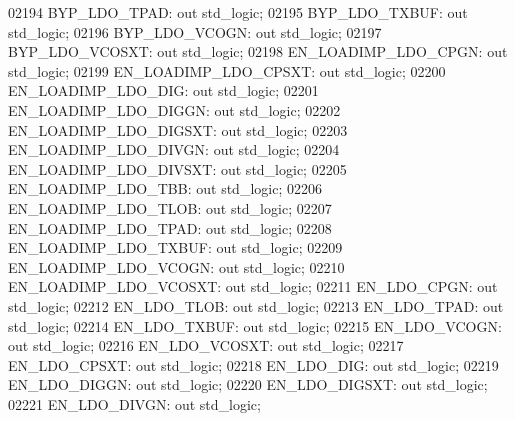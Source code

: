 \begin{DoxyCode}
02194     BYP\_LDO\_TPAD:   \textcolor{keywordflow}{out} \textcolor{comment}{std\_logic};
02195     BYP\_LDO\_TXBUF:  \textcolor{keywordflow}{out} \textcolor{comment}{std\_logic};
02196     BYP\_LDO\_VCOGN:  \textcolor{keywordflow}{out} \textcolor{comment}{std\_logic};
02197     BYP\_LDO\_VCOSXT: \textcolor{keywordflow}{out} \textcolor{comment}{std\_logic};
02198     EN\_LOADIMP\_LDO\_CPGN:    \textcolor{keywordflow}{out} \textcolor{comment}{std\_logic};
02199     EN\_LOADIMP\_LDO\_CPSXT:   \textcolor{keywordflow}{out} \textcolor{comment}{std\_logic};
02200     EN\_LOADIMP\_LDO\_DIG: \textcolor{keywordflow}{out} \textcolor{comment}{std\_logic};
02201     EN\_LOADIMP\_LDO\_DIGGN:   \textcolor{keywordflow}{out} \textcolor{comment}{std\_logic};
02202     EN\_LOADIMP\_LDO\_DIGSXT:  \textcolor{keywordflow}{out} \textcolor{comment}{std\_logic};
02203     EN\_LOADIMP\_LDO\_DIVGN:   \textcolor{keywordflow}{out} \textcolor{comment}{std\_logic};
02204     EN\_LOADIMP\_LDO\_DIVSXT:  \textcolor{keywordflow}{out} \textcolor{comment}{std\_logic};
02205     EN\_LOADIMP\_LDO\_TBB: \textcolor{keywordflow}{out} \textcolor{comment}{std\_logic};
02206     EN\_LOADIMP\_LDO\_TLOB:    \textcolor{keywordflow}{out} \textcolor{comment}{std\_logic};
02207     EN\_LOADIMP\_LDO\_TPAD:    \textcolor{keywordflow}{out} \textcolor{comment}{std\_logic};
02208     EN\_LOADIMP\_LDO\_TXBUF:   \textcolor{keywordflow}{out} \textcolor{comment}{std\_logic};
02209     EN\_LOADIMP\_LDO\_VCOGN:   \textcolor{keywordflow}{out} \textcolor{comment}{std\_logic};
02210     EN\_LOADIMP\_LDO\_VCOSXT:  \textcolor{keywordflow}{out} \textcolor{comment}{std\_logic};
02211     EN\_LDO\_CPGN:    \textcolor{keywordflow}{out} \textcolor{comment}{std\_logic};
02212     EN\_LDO\_TLOB:    \textcolor{keywordflow}{out} \textcolor{comment}{std\_logic};
02213     EN\_LDO\_TPAD:    \textcolor{keywordflow}{out} \textcolor{comment}{std\_logic};
02214     EN\_LDO\_TXBUF:   \textcolor{keywordflow}{out} \textcolor{comment}{std\_logic};
02215     EN\_LDO\_VCOGN:   \textcolor{keywordflow}{out} \textcolor{comment}{std\_logic};
02216     EN\_LDO\_VCOSXT:  \textcolor{keywordflow}{out} \textcolor{comment}{std\_logic};
02217     EN\_LDO\_CPSXT:   \textcolor{keywordflow}{out} \textcolor{comment}{std\_logic};
02218     EN\_LDO\_DIG: \textcolor{keywordflow}{out} \textcolor{comment}{std\_logic};
02219     EN\_LDO\_DIGGN:   \textcolor{keywordflow}{out} \textcolor{comment}{std\_logic};
02220     EN\_LDO\_DIGSXT:  \textcolor{keywordflow}{out} \textcolor{comment}{std\_logic};
02221     EN\_LDO\_DIVGN:   \textcolor{keywordflow}{out} \textcolor{comment}{std\_logic};

\end{DoxyCode}
